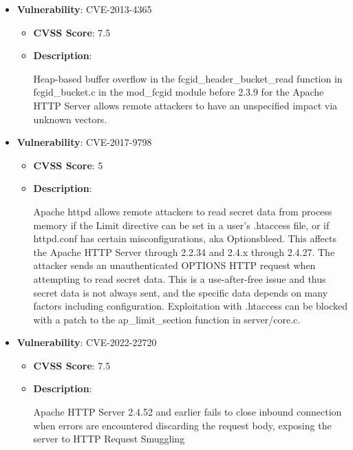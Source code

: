 \documentclass{article}
\begin{document}
\begin{itemize}
        \item \textbf{Vulnerability}: CVE-2013-4365
        \begin{itemize}
            \item \textbf{CVSS Score}:  7.5 
            \item \textbf{Description}:
            \parbox[t]{0.9\linewidth}{
                \ttfamily Heap-based buffer overflow in the fcgid\_header\_bucket\_read function in fcgid\_bucket.c in the mod\_fcgid module before 2.3.9 for the Apache HTTP Server allows remote attackers to have an unspecified impact via unknown vectors.
            }
        \end{itemize}
    
        \item \textbf{Vulnerability}: CVE-2017-9798
        \begin{itemize}
            \item \textbf{CVSS Score}:  5 
            \item \textbf{Description}:
            \parbox[t]{0.9\linewidth}{
                \ttfamily Apache httpd allows remote attackers to read secret data from process memory if the Limit directive can be set in a user's .htaccess file, or if httpd.conf has certain misconfigurations, aka Optionsbleed. This affects the Apache HTTP Server through 2.2.34 and 2.4.x through 2.4.27. The attacker sends an unauthenticated OPTIONS HTTP request when attempting to read secret data. This is a use-after-free issue and thus secret data is not always sent, and the specific data depends on many factors including configuration. Exploitation with .htaccess can be blocked with a patch to the ap\_limit\_section function in server/core.c.
            }
        \end{itemize}
    
        \item \textbf{Vulnerability}: CVE-2022-22720
        \begin{itemize}
            \item \textbf{CVSS Score}:  7.5 
            \item \textbf{Description}:
            \parbox[t]{0.9\linewidth}{
                \ttfamily Apache HTTP Server 2.4.52 and earlier fails to close inbound connection when errors are encountered discarding the request body, exposing the server to HTTP Request Smuggling
            }
        \end{itemize}
    

\end{itemize}
\end{document}
